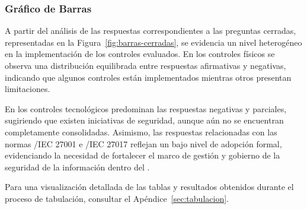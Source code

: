 \subsubsection{Gráfico de Barras}

A partir del análisis de las respuestas correspondientes a las preguntas cerradas, representadas en la Figura~\ref{fig:barras-cerradas}, 
se evidencia un nivel heterogéneo en la implementación de los controles evaluados. En los controles físicos se observa una distribución 
equilibrada entre respuestas afirmativas y negativas, indicando que algunos controles están implementados mientras otros presentan 
limitaciones.

En los controles tecnológicos predominan las respuestas negativas y parciales, sugiriendo que existen iniciativas de seguridad, aunque aún 
no se encuentran completamente consolidadas. Asimismo, las respuestas relacionadas con las normas \ISO/IEC 27001 e \ISO/IEC 27017 reflejan 
un bajo nivel de adopción formal, evidenciando la necesidad de fortalecer el marco de gestión y gobierno de la seguridad de la información 
dentro del \GRID.


Para una visualización detallada de las tablas y resultados obtenidos durante el proceso de tabulación, consultar el 
Apéndice~\ref{sec:tabulacion}.
